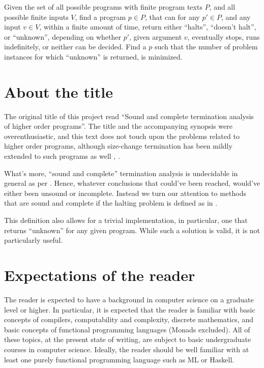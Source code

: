 \begin{definition}\label{definition:halting-2} Given the set of all possible
programs with finite program texts $P$, and all possible finite inputs $V$,
find a program $p\in P$, that can for any $p'\in P$, and any input $v\in V$,
within a finite amount of time, return either ``halts'', ``doesn't halt'', or
``unknown'', depending on whether $p'$, given argument $v$, eventually stops,
runs indefinitely, or neither can be decided. Find a $p$ such that the number
of problem instances for which ``unknown'' is returned, is
minimized.\end{definition}

\section{About the title}

The original title of this project read ``Sound and complete termination
analysis of higher order programs''. The title and the accompanying synopsis
were overenthusiastic, and this text does not touch upon the problems related
to higher order programs, although size-change termination has been mildly
extended to such programs as well \cite{sct-untyped-lambda},
\cite{sct-higher-order}.

What's more, ``sound and complete'' termination analysis is undecidable in
general as per . Hence, whatever conclusions that
could've been reached, would've either been unsound or incomplete. Instead we
turn our attention to methods that are sound and complete if the halting
problem is defined as in .

This definition also allows for a trivial implementation, in particular, one
that returns ``unknown'' for any given program. While such a solution is valid,
it is not particularly useful.

\section{Expectations of the reader}

The reader is expected to have a background in computer science on a graduate
level or higher. In particular, it is expected that the reader is familiar with
basic concepts of compilers, computability and complexity, discrete
mathematics, and basic concepts of functional programming languages (Monads
excluded). All of these topics, at the present state of writing, are subject to
basic undergraduate courses in computer science. Ideally, the reader should be
well familiar with at least one purely functional programming language such as
ML or Haskell.


